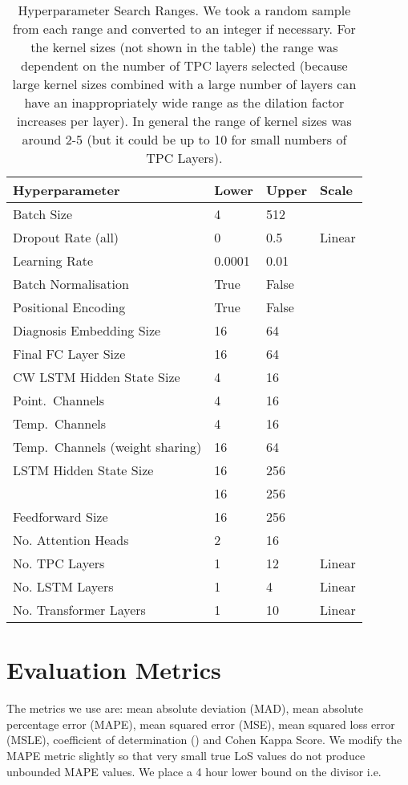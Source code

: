 \documentclass[sigconf]{acmart}
\begin{document}
\begin{table}[h]
  \caption{Hyperparameter Search Ranges. We took a random sample from each range and converted to an integer if necessary. For the kernel sizes (not shown in the table) the range was dependent on the number of TPC layers selected (because large kernel sizes combined with a large number of layers can have an inappropriately wide range as the dilation factor increases per layer). In general the range of kernel sizes was around 2-5 (but it could be up to 10 for small numbers of TPC Layers).}
  \label{tab:hyperparamsearch}
  \small
  \centering
  \begin{tabular}{llll}
    \toprule
    \textbf{Hyperparameter} & \textbf{Lower} & \textbf{Upper} & \textbf{Scale}\\
    \midrule
    Batch Size & 4 & 512 & \\
    Dropout Rate (all) & 0 & 0.5 & Linear\\
    Learning Rate & 0.0001 & 0.01 & \\
    Batch Normalisation & True & False & \\
    Positional Encoding & True & False & \\
    Diagnosis Embedding Size & 16 & 64 & \\
    Final FC Layer Size & 16 & 64 & \\
    CW LSTM Hidden State Size & 4 & 16 & \\
    Point.\ Channels & 4 & 16 & \\
    Temp.\ Channels & 4 & 16 & \\
    Temp.\ Channels (weight sharing) & 16 & 64 & \\
    LSTM Hidden State Size & 16 & 256 & \\
     & 16 & 256 & \\
    Feedforward Size & 16 & 256 & \\
    No. Attention Heads & 2 & 16 & \\
    No. TPC Layers & 1 & 12 & Linear\\
    No. LSTM Layers & 1 & 4 & Linear\\
    No. Transformer Layers & 1 & 10 & Linear\\
    \bottomrule
  \end{tabular}
\end{table}

\section{Evaluation Metrics}
\label{evaluationmetrics}
The metrics we use are: mean absolute deviation (MAD), mean absolute percentage error (MAPE), mean squared error (MSE), mean squared loss error (MSLE), coefficient of determination () and Cohen Kappa Score. We modify the MAPE metric slightly so that very small true LoS values do not produce unbounded MAPE values. We place a 4 hour lower bound on the divisor i.e. 
 
\end{document}
